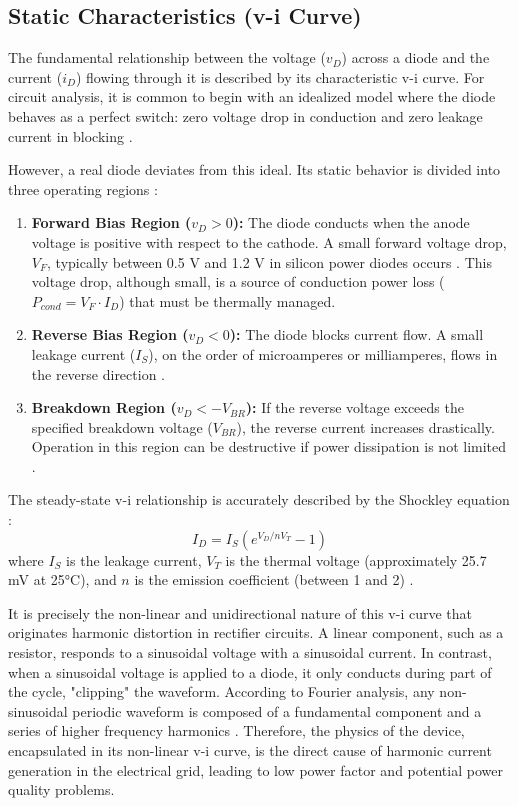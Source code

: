 \documentclass[12pt,a4paper]{article}
\begin{document}
\subsection{Static Characteristics (v-i Curve)}

The fundamental relationship between the voltage ($v_D$) across a diode and the current ($i_D$) flowing through it is described by its characteristic v-i curve. For circuit analysis, it is common to begin with an idealized model where the diode behaves as a perfect switch: zero voltage drop in conduction and zero leakage current in blocking \cite{rashid2014, mohan2003}.

However, a real diode deviates from this ideal. Its static behavior is divided into three operating regions \cite{rashid2014}:

\begin{enumerate}
    \item \textbf{Forward Bias Region ($v_D > 0$):} The diode conducts when the anode voltage is positive with respect to the cathode. A small forward voltage drop, $V_F$, typically between 0.5 V and 1.2 V in silicon power diodes occurs \cite{rashid2014}. This voltage drop, although small, is a source of conduction power loss ($P_{cond} = V_F \cdot I_D$) that must be thermally managed.
    
    \item \textbf{Reverse Bias Region ($v_D < 0$):} The diode blocks current flow. A small leakage current ($I_S$), on the order of microamperes or milliamperes, flows in the reverse direction \cite{rashid2014}.
    
    \item \textbf{Breakdown Region ($v_D < -V_{BR}$):} If the reverse voltage exceeds the specified breakdown voltage ($V_{BR}$), the reverse current increases drastically. Operation in this region can be destructive if power dissipation is not limited \cite{rashid2014}.
\end{enumerate}

The steady-state v-i relationship is accurately described by the Shockley equation \cite{rashid2014}:
\begin{equation}
I_{D}=I_{S}(e^{V_{D}/nV_{T}}-1)
\end{equation}
where $I_S$ is the leakage current, $V_T$ is the thermal voltage (approximately 25.7 mV at 25°C), and $n$ is the emission coefficient (between 1 and 2) \cite{rashid2014}.

It is precisely the non-linear and unidirectional nature of this v-i curve that originates harmonic distortion in rectifier circuits. A linear component, such as a resistor, responds to a sinusoidal voltage with a sinusoidal current. In contrast, when a sinusoidal voltage is applied to a diode, it only conducts during part of the cycle, "clipping" the waveform. According to Fourier analysis, any non-sinusoidal periodic waveform is composed of a fundamental component and a series of higher frequency harmonics \cite{rashid2014}. Therefore, the physics of the device, encapsulated in its non-linear v-i curve, is the direct cause of harmonic current generation in the electrical grid, leading to low power factor and potential power quality problems.
\end{document}
